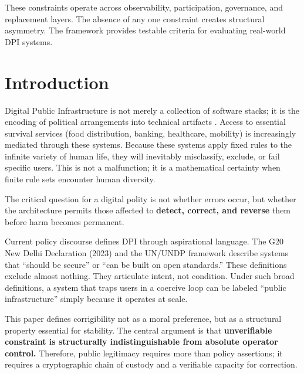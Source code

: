 \documentclass{article}
\begin{document}
These constraints operate across observability, participation, governance, and replacement layers. The absence of any one constraint creates structural asymmetry. The framework provides testable criteria for evaluating real-world DPI systems.

\section{Introduction}

Digital Public Infrastructure is not merely a collection of software stacks; it is the encoding of political arrangements into technical artifacts \citep{winner1980}. Access to essential survival services (food distribution, banking, healthcare, mobility) is increasingly mediated through these systems. Because these systems apply fixed rules to the infinite variety of human life, they will inevitably misclassify, exclude, or fail specific users. This is not a malfunction; it is a mathematical certainty when finite rule sets encounter human diversity.

The critical question for a digital polity is not whether errors occur, but whether the architecture permits those affected to \textbf{detect, correct, and reverse} them before harm becomes permanent.

Current policy discourse defines DPI through aspirational language. The G20 New Delhi Declaration (2023) and the UN/UNDP framework \citep{undp} describe systems that ``should be secure'' or ``can be built on open standards.'' These definitions exclude almost nothing. They articulate intent, not condition. Under such broad definitions, a system that traps users in a coercive loop can be labeled ``public infrastructure'' simply because it operates at scale.

This paper defines corrigibility not as a moral preference, but as a structural property essential for stability. The central argument is that \textbf{unverifiable constraint is structurally indistinguishable from absolute operator control.} Therefore, public legitimacy requires more than policy assertions; it requires a cryptographic chain of custody and a verifiable capacity for correction.
\end{document}
